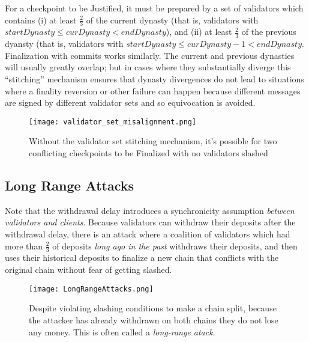 \documentclass[12pt]{article}
\begin{document}
For a checkpoint to be Justified, it must be prepared by a set of validators which contains (i) at least $\frac{2}{3}$ of the current dynasty (that is, validators with $startDynasty \le curDynasty < endDynasty$), and (ii) at least $\frac{2}{3}$ of the previous dyansty (that is, validators with $startDynasty \le curDynasty - 1 < endDynasty$. Finalization with commits works similarly. The current and previous dynasties will usually greatly overlap; but in cases where they substantially diverge this ``stitching'' mechanism ensures that dynasty divergences do not lead to situations where a finality reversion or other failure can happen because different messages are signed by different validator sets and so equivocation is avoided.

\begin{figure}[h!tb]
\centering
\texttt{[image: validator\_set\_misalignment.png]}
\caption{Without the validator set stitching mechanism, it's possible for two conflicting checkpoints to be Finalized with no validators slashed}
\label{fig:dynamic2}
\end{figure}

\subsection{Long Range Attacks}

Note that the withdrawal delay introduces a synchronicity assumption \textit{between validators and clients}. Because validators can withdraw their deposits after the withdrawal delay, there is an attack where a coalition of validators which had more than $\frac{2}{3}$ of deposits \textit{long ago in the past} withdraws their deposits, and then uses their historical deposits to finalize a new chain that conflicts with the original chain without fear of getting slashed.

\begin{figure}[h!tb]
\centering
\texttt{[image: LongRangeAttacks.png]}
\caption{Despite violating slashing conditions to make a chain split, because the attacker has already withdrawn on both chains they do not lose any money. This is often called a \textit{long-range atack}.}
\label{fig:dynamic3}
\end{figure}
\end{document}
